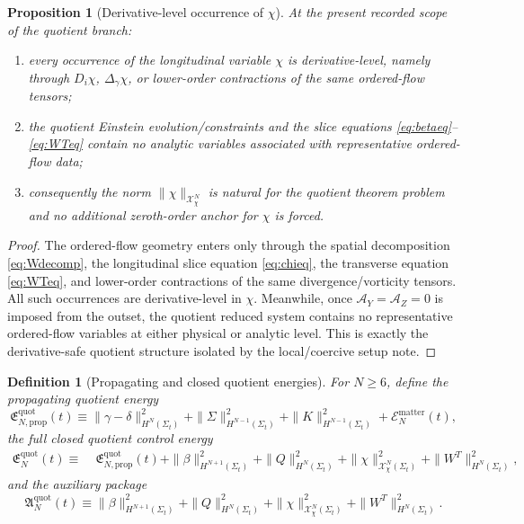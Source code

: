 \documentclass[11pt]{article}
\newcommand{\AY}{\mathcal A_Y}
\newcommand{\AZ}{\mathcal A_Z}
\newtheorem{definition}{Definition}
\newtheorem{proposition}{Proposition}
\begin{document}
\begin{proposition}[Derivative-level occurrence of \texorpdfstring{\(\chi\)}{chi}]
\label{prop:derivative}
At the present recorded scope of the quotient branch:
\begin{enumerate}
    \item every occurrence of the longitudinal variable \(\chi\) is derivative-level, namely through \(D_i\chi\), \(\Delta_\gamma\chi\), or lower-order contractions of the same ordered-flow tensors;
    \item the quotient Einstein evolution/constraints and the slice equations \eqref{eq:betaeq}--\eqref{eq:WTeq} contain no analytic variables associated with representative ordered-flow data;
    \item consequently the norm \(\|\chi\|_{\mathcal X_\chi^N}\) is natural for the quotient theorem problem and no additional zeroth-order anchor for \(\chi\) is forced.
\end{enumerate}
\end{proposition}

\begin{proof}
The ordered-flow geometry enters only through the spatial decomposition \eqref{eq:Wdecomp}, the longitudinal slice equation \eqref{eq:chieq}, the transverse equation \eqref{eq:WTeq}, and lower-order contractions of the same divergence/vorticity tensors. All such occurrences are derivative-level in \(\chi\). Meanwhile, once \(\AY=\AZ=0\) is imposed from the outset, the quotient reduced system contains no representative ordered-flow variables at either physical or analytic level. This is exactly the derivative-safe quotient structure isolated by the local/coercive setup note.
\end{proof}

\begin{definition}[Propagating and closed quotient energies]
\label{def:E}
For \(N\ge 6\), define the propagating quotient energy
\begin{equation}
\mathfrak E_{N,\mathrm{prop}}^{\mathrm{quot}}(t)
\equiv
\|\gamma-\delta\|_{H^N(\Sigma_t)}^2
+\|\Sigma\|_{H^{N-1}(\Sigma_t)}^2
+\|K\|_{H^{N-1}(\Sigma_t)}^2
+\mathcal E_N^{\mathrm{matter}}(t),
\label{eq:Eprop}
\end{equation}
the full closed quotient control energy
\begin{align}
\mathfrak E_N^{\mathrm{quot}}(t)
\equiv\;&
\mathfrak E_{N,\mathrm{prop}}^{\mathrm{quot}}(t)
+\|\beta\|_{H^{N+1}(\Sigma_t)}^2
+\|Q\|_{H^N(\Sigma_t)}^2
+\|\chi\|_{\mathcal X_\chi^N(\Sigma_t)}^2
+\|W^T\|_{H^N(\Sigma_t)}^2,
\label{eq:Equot}
\end{align}
and the auxiliary package
\begin{equation}
\mathfrak A_N^{\mathrm{quot}}(t)
\equiv
\|\beta\|_{H^{N+1}(\Sigma_t)}^2
+\|Q\|_{H^N(\Sigma_t)}^2
+\|\chi\|_{\mathcal X_\chi^N(\Sigma_t)}^2
+\|W^T\|_{H^N(\Sigma_t)}^2.
\label{eq:Aquot}
\end{equation}
\end{definition}
\end{document}
